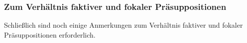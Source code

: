 \documentclass[output=paper]{langscibook}
\begin{document}
\begin{otherlanguage}{german}

    
    


\subsubsection{Zum Verhältnis faktiver und fokaler Präsuppositionen} \label{sec:zi83:3.4.6}
\largerpage
Schließlich sind noch einige Anmerkungen zum Verhältnis faktiver und fokaler Präsuppositionen erforderlich.


\end{otherlanguage}
\end{document}
